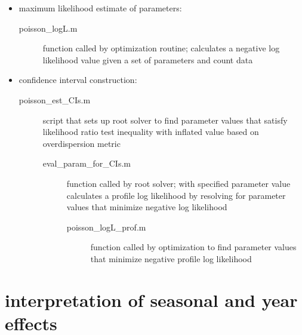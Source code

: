 \documentclass[11pt]{article}
\begin{document}

\begin{itemize}
\item maximum likelihood estimate of parameters:
\begin{description}
\item [poisson\_logL.m] function called by optimization routine; calculates a negative log likelihood value given a set of parameters and count data
\end{description}

\item confidence interval construction:
\begin{description}
\item [poisson\_est\_CIs.m] script that sets up root solver to find parameter values that satisfy likelihood ratio test inequality with inflated value based on overdispersion metric 
\begin{description}
\item [eval\_param\_for\_CIs.m] function called by root solver; with specified parameter value calculates a profile log likelihood by resolving for parameter values that minimize negative log likelihood
\begin{description}
\item [poisson\_logL\_prof.m] function called by optimization to find parameter values that minimize negative profile log likelihood
\end{description}
\end{description}
\end{description}
\end{itemize}


\section{interpretation of seasonal and year effects} 
\end{document}
